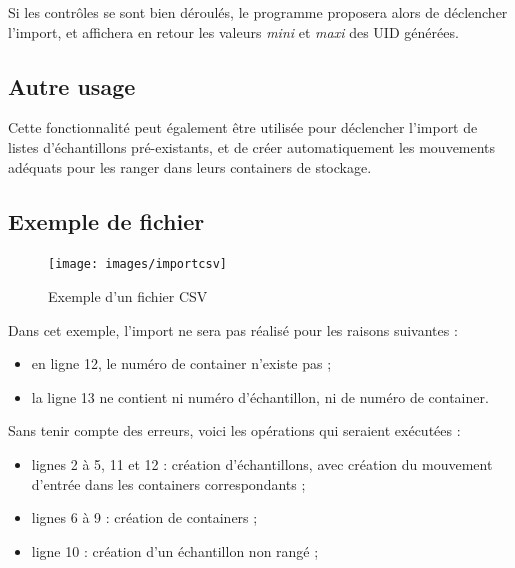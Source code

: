 Si les contrôles se sont bien déroulés, le programme proposera alors de déclencher l'import, et affichera en retour les valeurs \textit{mini} et \textit{maxi} des UID générées.

\subsection{Autre usage}
Cette fonctionnalité peut également être utilisée pour déclencher l'import de listes d'échantillons pré-existants, et de créer automatiquement les mouvements adéquats pour les ranger dans leurs containers de stockage.

\subsection{Exemple de fichier}
\begin{figure}[H]
\texttt{[image: images/importcsv]}
\caption{Exemple d'un fichier CSV}
\end{figure}

Dans cet exemple, l'import ne sera pas réalisé pour les raisons suivantes :
\begin{itemize}
\item en ligne 12, le numéro de container n'existe pas ;
\item la ligne 13 ne contient ni numéro d'échantillon, ni de numéro de container.
\end{itemize}

Sans tenir compte des erreurs, voici les opérations qui seraient exécutées :
\begin{itemize}
\item lignes 2 à 5, 11 et 12 : création d'échantillons, avec création du mouvement d'entrée dans les containers correspondants ;
\item lignes 6 à 9 : création de containers ;
\item ligne 10 : création d'un échantillon non rangé ;
\end{itemize}
